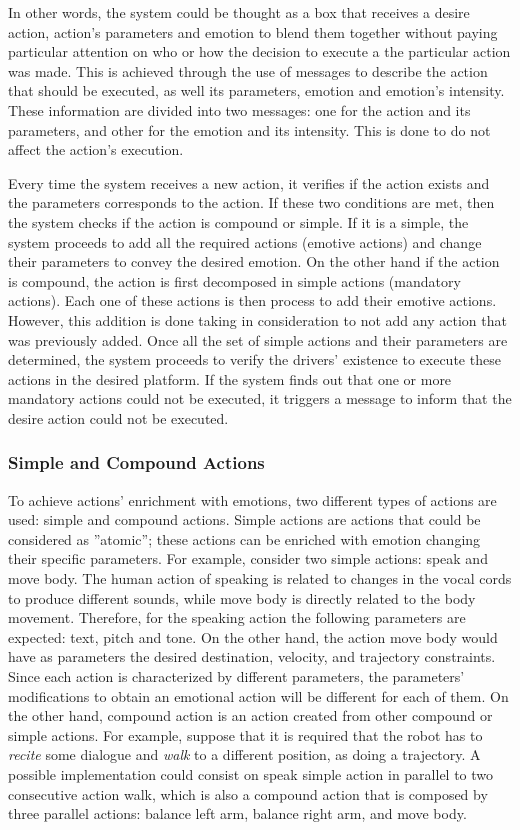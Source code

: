 In other words, the system could be thought as a box that receives a desire action, action's parameters and emotion to blend them together without paying particular attention on who or how the decision to execute a the particular action was made. This is achieved through the use of messages to describe the action that should be executed, as well its parameters, emotion and emotion's intensity.  These information are divided into two messages: one for the action and its parameters, and other for the emotion and its intensity. This is done to do not affect the action's execution.

Every time the system receives a new action, it verifies if the action exists and the parameters corresponds to the action. If these two conditions are met, then the system checks if the action is compound or simple. If it is a simple, the system proceeds to add all the required actions (emotive actions) and change their parameters to convey the desired emotion. On the other hand if the action is compound, the action is first decomposed in simple actions (mandatory actions). Each one of these actions is then process to add their emotive actions. However, this addition is done taking in consideration to not add any action that was previously added. Once all the set of simple actions and their parameters are determined, the system proceeds to verify the drivers' existence to execute these actions in the desired platform. If the system finds out that one or more mandatory actions could not be executed, it triggers a message to inform that the desire action could not be executed. 

\subsubsection{Simple and Compound Actions}

To achieve actions' enrichment with emotions, two different types of actions are used: simple and compound actions. Simple actions are actions that could be considered as ''atomic''; these actions can be enriched with emotion changing their specific parameters. For example, consider two simple actions: speak and move body. The human action of speaking is related to changes in the vocal cords to produce different sounds, while move body is directly related to the body movement. Therefore, for the speaking action the following parameters are expected: text, pitch and tone. On the other hand, the action move body would have as parameters the desired destination, velocity, and trajectory constraints. Since each action is characterized by different parameters, the parameters' modifications to obtain an emotional action will be different for each of them. On the other hand, compound action is an action created from other compound or simple actions. For example, suppose that it is required that the robot has to \textit{recite} some dialogue and \textit{walk} to a different position, as doing a trajectory. A possible implementation could consist on speak simple action in parallel to two consecutive action walk, which is also a compound action that is composed by three parallel actions: balance left arm, balance right arm, and move body.

